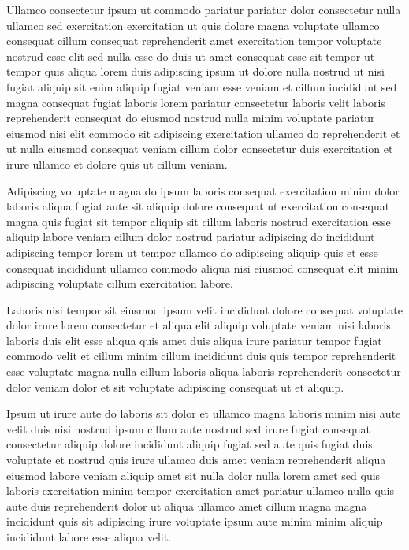 \documentclass{article}
\begin{document}
Ullamco consectetur ipsum ut commodo pariatur pariatur dolor consectetur nulla ullamco sed exercitation exercitation ut quis dolore magna voluptate ullamco consequat cillum consequat reprehenderit amet exercitation tempor voluptate nostrud esse elit sed nulla esse do duis ut amet consequat esse sit tempor ut tempor quis aliqua lorem duis adipiscing ipsum ut dolore nulla nostrud ut nisi fugiat aliquip sit enim aliquip fugiat veniam esse veniam et cillum incididunt sed magna consequat fugiat laboris lorem pariatur consectetur laboris velit laboris reprehenderit consequat do eiusmod nostrud nulla minim voluptate pariatur eiusmod nisi elit commodo sit adipiscing exercitation ullamco do reprehenderit et ut nulla eiusmod consequat veniam cillum dolor consectetur duis exercitation et irure ullamco et dolore quis ut cillum veniam.

Adipiscing voluptate magna do ipsum laboris consequat exercitation minim dolor laboris aliqua fugiat aute sit aliquip dolore consequat ut exercitation consequat magna quis fugiat sit tempor aliquip sit cillum laboris nostrud exercitation esse aliquip labore veniam cillum dolor nostrud pariatur adipiscing do incididunt adipiscing tempor lorem ut tempor ullamco do adipiscing aliquip quis et esse consequat incididunt ullamco commodo aliqua nisi eiusmod consequat elit minim adipiscing voluptate cillum exercitation labore.

Laboris nisi tempor sit eiusmod ipsum velit incididunt dolore consequat voluptate dolor irure lorem consectetur et aliqua elit aliquip voluptate veniam nisi laboris laboris duis elit esse aliqua quis amet duis aliqua irure pariatur tempor fugiat commodo velit et cillum minim cillum incididunt duis quis tempor reprehenderit esse voluptate magna nulla cillum laboris aliqua laboris reprehenderit consectetur dolor veniam dolor et sit voluptate adipiscing consequat ut et aliquip.

Ipsum ut irure aute do laboris sit dolor et ullamco magna laboris minim nisi aute velit duis nisi nostrud ipsum cillum aute nostrud sed irure fugiat consequat consectetur aliquip dolore incididunt aliquip fugiat sed aute quis fugiat duis voluptate et nostrud quis irure ullamco duis amet veniam reprehenderit aliqua eiusmod labore veniam aliquip amet sit nulla dolor nulla lorem amet sed quis laboris exercitation minim tempor exercitation amet pariatur ullamco nulla quis aute duis reprehenderit dolor ut aliqua ullamco amet cillum magna magna incididunt quis sit adipiscing irure voluptate ipsum aute minim minim aliquip incididunt labore esse aliqua velit.
\end{document}
